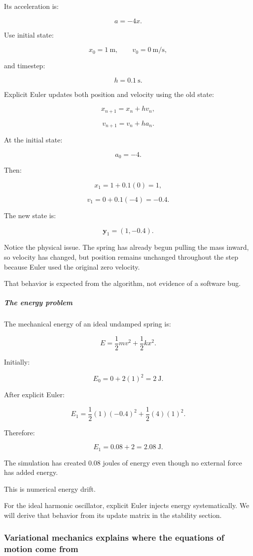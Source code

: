 Its acceleration is:

\[
a=-4x.
\]

Use initial state:

\[
x_0=1\ \mathrm m, \qquad v_0=0\ \mathrm{m/s},
\]

and timestep:

\[
h=0.1\ \mathrm s.
\]

Explicit Euler updates both position and velocity using the old state:

\[
x_{n+1}=x_n+hv_n,
\]

\[
v_{n+1}=v_n+ha_n.
\]

At the initial state:

\[
a_0=-4.
\]

Then:

\[
x_1=1+0.1(0)=\boxed{1},
\]

\[
v_1=0+0.1(-4)=\boxed{-0.4}.
\]

The new state is:

\[
\boxed{\mathbf y_1=(1,-0.4)}.
\]

Notice the physical issue. The spring has already begun pulling the mass inward, so velocity has changed, but position remains unchanged throughout the step because Euler used the original zero velocity.

That behavior is expected from the algorithm, not evidence of a software bug.

\subparagraph{The energy problem}\label{02-foundations-ii-ch025-the-energy-problem}

The mechanical energy of an ideal undamped spring is:

\[
E=\frac12mv^2+\frac12kx^2.
\]

Initially:

\[
E_0=0+2(1)^2=\boxed{2\ \mathrm J}.
\]

After explicit Euler:

\[
E_1= \frac12(1)(-0.4)^2+ \frac12(4)(1)^2.
\]

Therefore:

\[
E_1=0.08+2=\boxed{2.08\ \mathrm J}.
\]

The simulation has created \(0.08\) joules of energy even though no external force has added energy.

This is numerical energy drift.

For the ideal harmonic oscillator, explicit Euler injects energy systematically. We will derive that behavior from its update matrix in the stability section.

\subsubsection{Variational mechanics explains where the equations of motion come from}\label{02-foundations-ii-ch025-variational-mechanics-explains-where-the-equations-of-motion-come-from}

